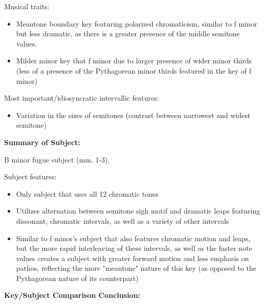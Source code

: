 Musical traits:

\begin{itemize}
\tightlist
\item
  Meantone boundary key featuring polarized chromaticism, similar to f
  minor but less dramatic, as there is a greater presence of the middle
  semitone values.
\item
  Milder minor key that f minor due to larger presence of wider minor
  thirds (less of a presence of the Pythagorean minor thirds featured in
  the key of f minor)
\end{itemize}

Most important/idiosyncratic intervallic features:

\begin{itemize}
\tightlist
\item
  Variation in the sizes of semitones (contrast between narrowest and
  widest semitone)
\end{itemize}

\textbf{Summary of Subject:}



\begin{Example}[H]
    \begin{center}
    \caption{ B minor fugue subject (mm. 1-3). }
    \end{center}
\end{Example}
    
    Subject features:

\begin{itemize}
\tightlist
\item
  Only subject that uses all 12 chromatic tones
\item
  Utilizes alternation between semitone sigh motif and dramatic leaps
  featuring dissonant, chromatic intervals, as well as a variety of
  other intervals
\item
  Similar to f minor's subject that also features chromatic motion and
  leaps, but the more rapid interleaving of these intervals, as well as
  the faster note values creates a subject with greater forward motion
  and less emphasis on pathos, reflecting the more "meantone" nature of
  this key (as opposed to the Pythagorean nature of its counterpart)
\end{itemize}

\textbf{Key/Subject Comparison Conclusion:}

